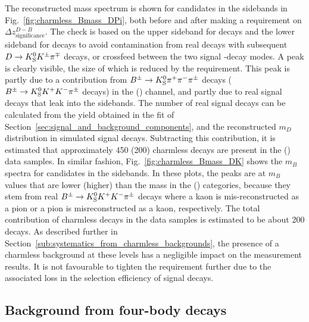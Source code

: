 The reconstructed \B mass spectrum is shown for \BtoDpi candidates in the \D sidebands in Fig.~\ref{fig:charmless_Bmass_DPi}, both before and after making a requirement on $\Delta z^{D-B}_{\text{significance}}$. The check is based on the upper \D sideband for \DtoKspipi decays and the lower \D sideband for \DtoKsKK decays to avoid contamination from real \BtoDh decays with subsequent ${D}\rightarrow{\ensuremath{{K}^0_{\mathrm{S}}}}{\ensuremath{{K}^\pm}}{\ensuremath{{\pi}^\mp}}$ decays, or crossfeed between the two signal \D-decay modes. A peak is clearly visible, the size of which is reduced by the requirement. This peak is partly due to a contribution from ${{B}^\pm}\rightarrow{\ensuremath{{K}^0_{\mathrm{S}}}}{\ensuremath{{\pi}^+}}{\ensuremath{{\pi}^-}}{\ensuremath{{\pi}^\pm}}$ decays (${{{B}^\pm}\rightarrow{\ensuremath{{K}^0_{\mathrm{S}}}}{\ensuremath{{K}^+}}{\ensuremath{{K}^-}}{\ensuremath{{\pi}^\pm}}}$ decays) in the \DtoKspipi (\DtoKsKK) channel, and partly due to real signal decays that leak into the \D sidebands. The number of real signal decays can be calculated from the yield obtained in the fit of Section~\ref{sec:signal_and_background_components}, and the reconstructed $m_D$ distribution in simulated signal decays. Subtracting this contribution, it is estimated that approximately 450 (200) charmless decays are present in the \Kspipi (\KsKK) data samples. In similar fashion, Fig.~\ref{fig:charmless_Bmass_DK} shows the $m_B$ spectra for \BtoDK candidates in the \D sidebands. In these plots, the peaks are at $m_B$ values that are lower (higher) than the \B mass in the \KsPiPi (\KsKK) categories, because they stem from real ${{B}^\pm}\rightarrow{\ensuremath{{K}^0_{\mathrm{S}}}}{\ensuremath{{K}^+}}{\ensuremath{{K}^-}}{\ensuremath{{\pi}^\pm}}$ decays where a kaon is mis-reconstructed as a pion or a pion is misreconstructed as a kaon, respectively. The total contribution of charmless decays in the \BtoDK data samples is estimated to be about 200 decays. As described further in Section~\ref{sub:systematics_from_charmless_backgrounds}, the presence of a charmless background at these levels has a negligible impact on the measurement results. It is not favourable to tighten the requirement further due to the associated loss in the selection efficiency of signal decays.


\subsection{\texorpdfstring{Background from four-body \D decays}{Background from four-body D decays}}%
\label{sub:background_from_four_body_d_decays}

